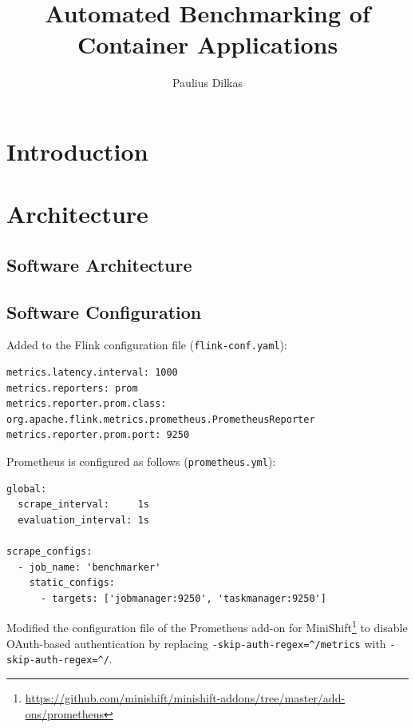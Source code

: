 \documentclass{article}
\title{Automated Benchmarking of Container Applications}
\author{Paulius Dilkas}
\begin{document}
\maketitle


\section{Introduction}


\section{Architecture}



\subsection{Software Architecture}




\subsection{Software Configuration}

Added to the Flink configuration file (\texttt{flink-conf.yaml}):
\begin{lstlisting}
metrics.latency.interval: 1000
metrics.reporters: prom
metrics.reporter.prom.class: org.apache.flink.metrics.prometheus.PrometheusReporter
metrics.reporter.prom.port: 9250
\end{lstlisting}

Prometheus is configured as follows (\texttt{prometheus.yml}):
\begin{lstlisting}
global:
  scrape_interval:     1s
  evaluation_interval: 1s

scrape_configs:
  - job_name: 'benchmarker'
    static_configs:
      - targets: ['jobmanager:9250', 'taskmanager:9250']
\end{lstlisting}

Modified the configuration file of the Prometheus add-on for
MiniShift\footnote{\url{https://github.com/minishift/minishift-addons/tree/master/add-ons/prometheus}}
to disable OAuth-based authentication by replacing
\texttt{-skip-auth-regex=\^{}/metrics} with \texttt{-skip-auth-regex=\^{}/}.
\end{document}
